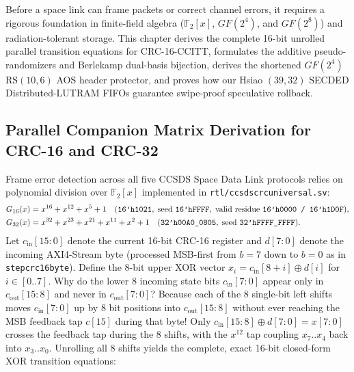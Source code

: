 \documentclass[10pt,a4paper]{article}
\renewcommand{\_}{\origunderscore\penalty0\hskip0pt\relax}
\numberwithin{equation}{section}
\numberwithin{table}{section}
\numberwithin{figure}{section}
\begin{document}
Before a space link can frame packets or correct channel errors, it requires a rigorous foundation in finite-field algebra ($\mathbb{F}_2[x]$, $GF(2^4)$, and $GF(2^8)$) and radiation-tolerant storage. This chapter derives the complete 16-bit unrolled parallel transition equations for CRC-16-CCITT, formulates the additive pseudo-randomizers and Berlekamp dual-basis bijection, derives the shortened $GF(2^4)$ $\text{RS}(10,6)$ AOS header protector, and proves how our Hsiao $(39,32)$ SECDED Distributed-LUTRAM FIFOs guarantee swipe-proof speculative rollback.

\subsection{Parallel Companion Matrix Derivation for CRC-16 and CRC-32}
Frame error detection across all five CCSDS Space Data Link protocols relies on polynomial division over $\mathbb{F}_2[x]$ implemented in \texttt{rtl/ccsds\_crc\_universal.sv}:
\begin{align}
  G_{16}(x) &= x^{16} + x^{12} + x^5 + 1 \quad (\texttt{16'h1021},\; \text{seed } \texttt{16'hFFFF},\; \text{valid residue } \texttt{16'h0000 / 16'h1D0F}), \\
  G_{32}(x) &= x^{32} + x^{23} + x^{21} + x^{11} + x^2 + 1 \quad (\texttt{32'h00A0\_0805},\; \text{seed } \texttt{32'hFFFF\_FFFF}).
\end{align}
Let $c_{\text{in}}[15:0]$ denote the current 16-bit CRC-16 register and $d[7:0]$ denote the incoming AXI4-Stream byte (processed MSB-first from $b=7$ down to $b=0$ as in \texttt{step\_crc16\_byte}). Define the 8-bit upper XOR vector $x_i = c_{\text{in}}[8+i] \oplus d[i]$ for $i \in [0..7]$. Why do the lower 8 incoming state bits $c_{\text{in}}[7:0]$ appear only in $c_{\text{out}}[15:8]$ and never in $c_{\text{out}}[7:0]$? Because each of the 8 single-bit left shifts moves $c_{\text{in}}[7:0]$ up by 8 bit positions into $c_{\text{out}}[15:8]$ without ever reaching the MSB feedback tap $c[15]$ during that byte! Only $c_{\text{in}}[15:8] \oplus d[7:0] = x[7:0]$ crosses the feedback tap during the 8 shifts, with the $x^{12}$ tap coupling $x_7..x_4$ back into $x_3..x_0$. Unrolling all 8 shifts yields the complete, exact 16-bit closed-form XOR transition equations:
\end{document}
